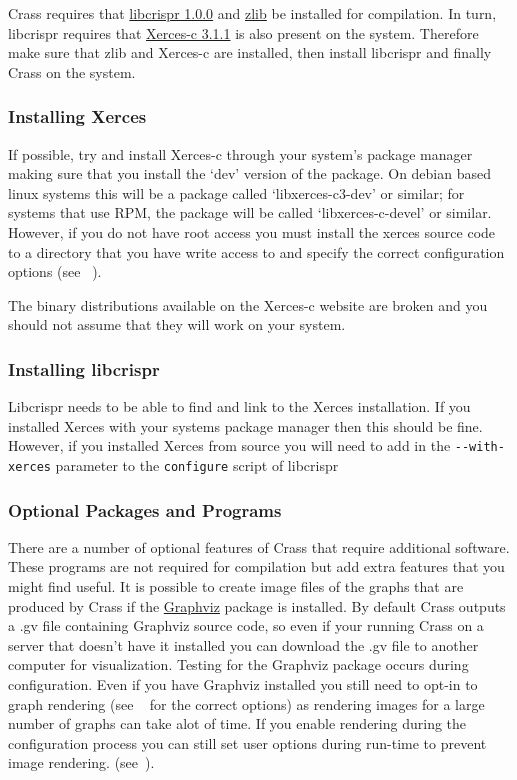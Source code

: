 \documentclass[11pt]{article} %
\newenvironment{warning}
  {\par\vspace{0.3cm}\begin{mdframed}[linewidth=2pt,linecolor=red]%
    \begin{list}{}{\leftmargin=1cm}
\sffamily\item[\color{red}\ding{43}]}
  {\end{list}\end{mdframed}\par\vspace{0.3cm}}
\begin{document}
Crass requires that \href{http://ctskennerton.github.com/libcrispr}{libcrispr 1.0.0} and \href{www.zlib.net}{zlib} be installed for compilation.
In turn, libcrispr requires that  \href{http://xerces.apache.org/}{Xerces-c 3.1.1} is also present on the system.  Therefore make sure that zlib and Xerces-c are installed, then install libcrispr and finally Crass on the system. 
\subsubsection{Installing Xerces}
If possible, try and install Xerces-c through your system's package manager making sure that you install the `dev' version of the package.  On debian based linux systems this will be a package called `libxerces-c3-dev' or similar; for systems that use RPM, the package will be called `libxerces-c-devel' or similar.  However, if you do not have root access you must install the xerces source code to a directory that you have write access to and specify the correct configuration options (see ~).
\begin{warning}
The binary distributions available on the Xerces-c website are broken and you should not assume that they will work on your system.  
\end{warning}
\subsubsection{Installing libcrispr}
Libcrispr needs to be able to find and link to the Xerces installation.  If you installed Xerces with your systems package manager then this should be fine.  However, if you installed Xerces from source you will need to add in the \texttt{-{}-with-xerces} parameter to the \texttt{configure} script of libcrispr
\subsubsection{Optional Packages and Programs}
There are a number of optional features of Crass that require additional software.  These programs are not required for compilation but add extra features that you might find useful.  It is possible to create image files of the graphs that are produced by Crass if the \href{www.graphviz.org}{Graphviz} package is installed.  By default Crass outputs a .gv file containing Graphviz source code, so even if your running Crass on a server that doesn't have it installed you can download the .gv file to another computer for visualization.  Testing for the Graphviz package occurs during configuration.  Even if you have Graphviz installed you still need to opt-in to graph rendering (see  ~ for the correct options) as rendering images for a large number of graphs can take alot of time.  If you enable rendering during the configuration process you can still set user options during run-time to prevent image rendering. (see~).
\end{document}
